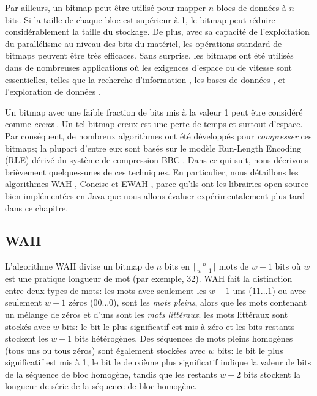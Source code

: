 Par ailleurs, un bitmap peut être utilisé pour mapper $n$ blocs de données à $n$ bits. Si la taille de chaque bloc est supérieur à 1, le bitmap peut réduire considérablement la taille du stockage. De plus, avec sa capacité de l'exploitation du parallélisme au niveau des bits du matériel, les opérations standard de bitmaps peuvent être très efficaces. Sans surprise, les bitmaps ont été utilisés dans de nombreuses applications où les exigences d'espace ou de vitesse sont essentielles, telles que la recherche d'information \citep{Chan:1998:BID:276305.276336}, les bases de données \citep{burdick2001mafia}, et l'exploration de données \citep{Ayres:2002:SPM:775047.775109,Uno:2005:LVC:1133905.1133916}.

Un bitmap avec une faible fraction de bits mis à la valeur 1 peut être considéré comme \emph{creux} \citep{lemire2014}. Un tel bitmap creux est une perte de temps et surtout d'espace. Par conséquent, de nombreux algorithmes ont été développés pour \emph{compresser} ces bitmaps; la plupart d'entre eux sont basés sur le modèle Run-Length Encoding (RLE) dérivé du système de compression BBC \citep{antoshenkov1995byte}. Dans ce qui suit, nous décrivons brièvement quelques-unes de ces techniques. En particulier, nous détaillons les algorithmes WAH \citep{wu2006optimizing}, Concise \citep{colantonio2010} et EWAH \citep{lemire2010}, parce qu'ils ont les librairies open source bien implémentées en Java que nous allons évaluer expérimentalement plus tard dans ce chapitre.

\subsection{WAH}

L'algorithme WAH \citep{wu2006optimizing} divise un bitmap de $n$ bits en $\lceil \frac{n}{w-1}\rceil$ mots de $w-1$ bits où $w$ est une pratique longueur de mot (par exemple, 32). WAH fait la distinction entre deux types de mots: les mots avec seulement les $w-1$ uns ($11\dots 1$) ou avec seulement $w-1$ zéros ($00\dots 0$), sont les \emph{mots pleins}, alors que les mots contenant un mélange de zéros et d'uns sont les \emph{mots littéraux}. les mots littéraux sont stockés avec $w$ bits: le bit le plus significatif est mis à zéro et les bits restants stockent les $w-1$ bits hétérogènes. Des séquences de mots pleins homogènes (tous uns ou tous zéros) sont également stockées avec $w$ bits: le bit le plus significatif est mis à 1, le bit le deuxième plus significatif indique la valeur de bits de la séquence de bloc homogène, tandis que les restants $w-2$ bits stockent la longueur de série de la séquence de bloc homogène.

